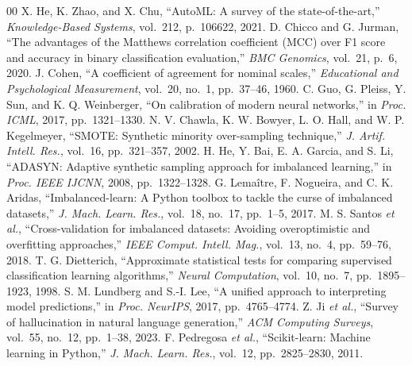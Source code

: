 \documentclass[10pt,twocolumn]{article}
\begin{document}
\begin{thebibliography}{00}
 X. He, K. Zhao, and X. Chu, ``AutoML: A survey of the
state-of-the-art,'' \emph{Knowledge-Based Systems}, vol.~212, p.~106622, 2021.
 D. Chicco and G. Jurman, ``The advantages of the
Matthews correlation coefficient (MCC) over F1 score and accuracy in binary
classification evaluation,'' \emph{BMC Genomics}, vol.~21, p.~6, 2020.
 J. Cohen, ``A coefficient of agreement for nominal
scales,'' \emph{Educational and Psychological Measurement}, vol.~20, no.~1,
pp.~37--46, 1960.
 C. Guo, G. Pleiss, Y. Sun, and K. Q. Weinberger,
``On calibration of modern neural networks,'' in \emph{Proc. ICML}, 2017,
pp.~1321--1330.
 N. V. Chawla, K. W. Bowyer, L. O. Hall, and W. P.
Kegelmeyer, ``SMOTE: Synthetic minority over-sampling technique,'' \emph{J.
Artif. Intell. Res.}, vol.~16, pp.~321--357, 2002.
 H. He, Y. Bai, E. A. Garcia, and S. Li, ``ADASYN:
Adaptive synthetic sampling approach for imbalanced learning,'' in \emph{Proc.
IEEE IJCNN}, 2008, pp.~1322--1328.
 G. Lema\^itre, F. Nogueira, and C. K. Aridas,
``Imbalanced-learn: A Python toolbox to tackle the curse of imbalanced
datasets,'' \emph{J. Mach. Learn. Res.}, vol.~18, no.~17, pp.~1--5, 2017.
 M. S. Santos \emph{et al.}, ``Cross-validation for
imbalanced datasets: Avoiding overoptimistic and overfitting approaches,''
\emph{IEEE Comput. Intell. Mag.}, vol.~13, no.~4, pp.~59--76, 2018.
 T. G. Dietterich, ``Approximate statistical tests for
comparing supervised classification learning algorithms,'' \emph{Neural
Computation}, vol.~10, no.~7, pp.~1895--1923, 1998.
 S. M. Lundberg and S.-I. Lee, ``A unified approach to
interpreting model predictions,'' in \emph{Proc. NeurIPS}, 2017, pp.~4765--4774.
 Z. Ji \emph{et al.}, ``Survey of hallucination in
natural language generation,'' \emph{ACM Computing Surveys}, vol.~55, no.~12,
pp.~1--38, 2023.
 F. Pedregosa \emph{et al.}, ``Scikit-learn:
Machine learning in Python,'' \emph{J. Mach. Learn. Res.}, vol.~12,
pp.~2825--2830, 2011.
\end{thebibliography}
\end{document}
